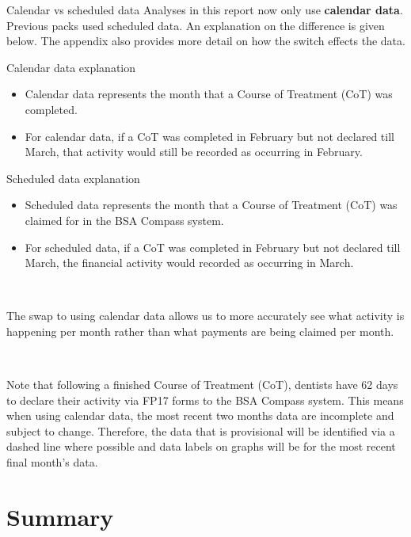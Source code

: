 \documentclass[
  8pt,
  ignorenonframetext,
  aspectratio = 169]{beamer}
\providecommand{\tightlist}{%
  \setlength{\itemsep}{0pt}\setlength{\parskip}{0pt}}
\begin{document}
\begin{frame}{Calendar vs scheduled data}
\protect\hypertarget{calendar-vs-scheduled-data}{}
Analyses in this report now only use \textbf{calendar data}. Previous
packs used scheduled data. An explanation on the difference is given
below. The appendix also provides more detail on how the switch effects
the data.

\begin{block}{Calendar data explanation}
\protect\hypertarget{calendar-data-explanation}{}
\begin{itemize}
\tightlist
\item
  Calendar data represents the month that a Course of Treatment (CoT)
  was completed.
\item
  For calendar data, if a CoT was completed in February but not declared
  till March, that activity would still be recorded as occurring in
  February.
\end{itemize}
\end{block}

\begin{block}{Scheduled data explanation}
\protect\hypertarget{scheduled-data-explanation}{}
\begin{itemize}
\tightlist
\item
  Scheduled data represents the month that a Course of Treatment (CoT)
  was claimed for in the BSA Compass system.
\item
  For scheduled data, if a CoT was completed in February but not
  declared till March, the financial activity would recorded as
  occurring in March.
\end{itemize}

~

The swap to using calendar data allows us to more accurately see what
activity is happening per month rather than what payments are being
claimed per month.

~

Note that following a finished Course of Treatment (CoT), dentists have
62 days to declare their activity via FP17 forms to the BSA Compass
system. This means when using calendar data, the most recent two months
data are incomplete and subject to change. Therefore, the data that is
provisional will be identified via a dashed line where possible and data
labels on graphs will be for the most recent final month's data.
\end{block}
\end{frame}

\hypertarget{summary}{%
\section{Summary}\label{summary}}
\end{document}

